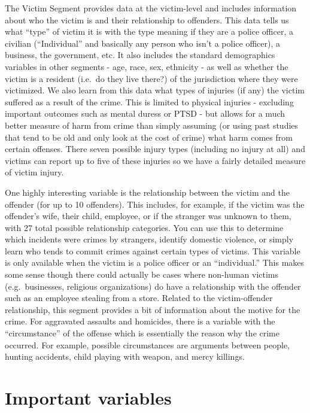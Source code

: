 \documentclass[
  12pt,
  openany]{book}
\begin{document}
The Victim Segment provides data at the victim-level and includes information about who the victim is and their relationship to offenders. This data tells us what ``type'' of victim it is with the type meaning if they are a police officer, a civilian (``Individual'' and basically any person who isn't a police officer), a business, the government, etc. It also includes the standard demographics variables in other segments - age, race, sex, ethnicity - as well as whether the victim is a resident (i.e.~do they live there?) of the jurisdiction where they were victimized. We also learn from this data what types of injuries (if any) the victim suffered as a result of the crime. This is limited to physical injuries - excluding important outcomes such as mental duress or PTSD - but allows for a much better measure of harm from crime than simply assuming (or using past studies that tend to be old and only look at the cost of crime) what harm comes from certain offenses. There seven possible injury types (including no injury at all) and victims can report up to five of these injuries so we have a fairly detailed measure of victim injury.

One highly interesting variable is the relationship between the victim and the offender (for up to 10 offenders). This includes, for example, if the victim was the offender's wife, their child, employee, or if the stranger was unknown to them, with 27 total possible relationship categories. You can use this to determine which incidents were crimes by strangers, identify domestic violence, or simply learn who tends to commit crimes against certain types of victims. This variable is only available when the victim is a police officer or an ``individual.'' This makes some sense though there could actually be cases where non-human victims (e.g.~businesses, religious organizations) do have a relationship with the offender such as an employee stealing from a store. Related to the victim-offender relationship, this segment provides a bit of information about the motive for the crime. For aggravated assaults and homicides, there is a variable with the ``circumstance'' of the offense which is essentially the reason why the crime occurred. For example, possible circumstances are arguments between people, hunting accidents, child playing with weapon, and mercy killings.

\hypertarget{important-variables-3}{%
\section{Important variables}\label{important-variables-3}}
\end{document}
